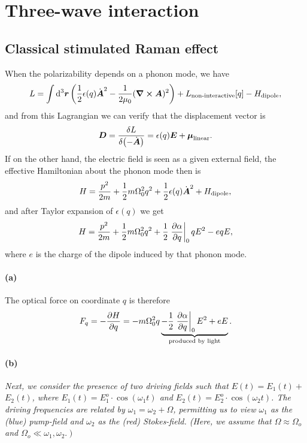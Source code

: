 \documentclass[hyperref, a4paper]{article}
\begin{document}
\section{Three-wave interaction} 

\subsection{Classical stimulated Raman effect}

When the polarizability depends on a phonon mode, we have 
\begin{equation}
    L = \int \dd[3]{\vb*{r}} \left(
        \frac{1}{2} \epsilon(q) \dot{\vb*{A}}^2 
        - \frac{1}{2 \mu_0} (\curl{\vb*{A}})^2
    \right) + L_{\text{non-interactive}}[q]
    - H_{\text{dipole}},
\end{equation}
and from this Lagrangian we can verify that the displacement vector is 
\begin{equation}
    \vb*{D} = \fdv{L}{(- \dot{\vb*{A}})}
    = \epsilon(q) \vb*{E} + \vb*{\mu}_{\text{linear}}.
\end{equation}
If on the other hand, the electric field is seen as a given external field, 
the effective Hamiltonian about the phonon mode then is 
\begin{equation}
    H = \frac{p^2}{2m} + \frac{1}{2} m \Omega_0^2 q^2 + \frac{1}{2} \epsilon(q) \dot{\vb*{A}}^2 
    + H_{\text{dipole}},
\end{equation}
and after Taylor expansion of $\epsilon(q)$ we get 
\begin{equation}
    H = \frac{p^2}{2m} + \frac{1}{2} m \Omega_0^2 q^2 + \frac{1}{2} \eval{\pdv{\alpha}{q}}_0 q E^2 
    - e q E,
\end{equation}
where $e$ is the charge of the dipole induced by that phonon mode. 

\paragraph*{(a)} The optical force on coordinate $q$ is therefore 
\begin{equation}
    F_q = - \pdv{H}{q} 
    = - m \Omega_0^2 q \underbrace{
        - \frac{1}{2} \eval{\pdv{\alpha}{q}}_0 E^2 + e E
    }_{\text{produced by light}}.
\end{equation} 

\paragraph*{(b)} \textit{
    Next, we consider the presence of two driving fields such that $E(t)=E_1(t)+$ $E_2(t)$, where $E_1(t)=E_1^o \cdot \cos \left(\omega_1 t\right)$ and $E_2(t)=E_2^o \cdot \cos \left(\omega_2 t\right)$. The driving frequencies are related by $\omega_1=\omega_2+\Omega$, permitting us to view $\omega_1$ as the (blue) pump-field and $\omega_2$ as the (red) Stokes-field. (Here, we assume that $\Omega \approx \Omega_o$ and $\left.\Omega_o \ll \omega_1, \omega_2.\right)$
}
\end{document}
